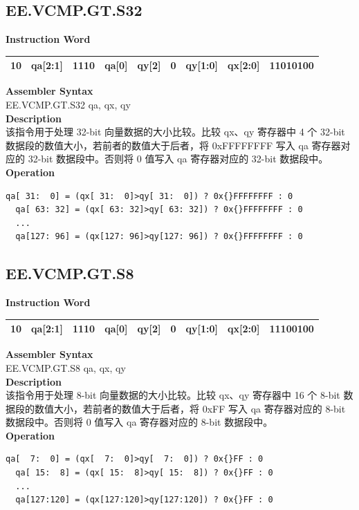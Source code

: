 \clearpage
\subsection{EE.VCMP.GT.S32}\label{instruction:EEVCMPGTS32}
\setlength\tabcolsep{6pt}
\textbf{Instruction Word} \\
\begin{tabular}{|c|c|c|c|c|c|c|c|c|}
	\hline
	10 & qa[2:1] & 1110 & qa[0] & qy[2] & 0 & qy[1:0] & qx[2:0] & 11010100 \\
	\hline
\end{tabular}

\textbf{Assembler Syntax} \\
EE.VCMP.GT.S32 qa, qx, qy \\
\textbf{Description} \\
该指令用于处理 32-bit 向量数据的大小比较。比较 qx、qy 寄存器中 4 个 32-bit 数据段的数值大小，若前者的数值大于后者，将 0x{}FFFFFFFF 写入 qa 寄存器对应的 32-bit 数据段中。否则将 0 值写入 qa 寄存器对应的 32-bit 数据段中。\\
\textbf{Operation}
\begin{lstlisting}[escapeinside=`?]
  qa[ 31:  0] = (qx[ 31:  0]>qy[ 31:  0]) ? 0x{}FFFFFFFF : 0
  qa[ 63: 32] = (qx[ 63: 32]>qy[ 63: 32]) ? 0x{}FFFFFFFF : 0
  ...
  qa[127: 96] = (qx[127: 96]>qy[127: 96]) ? 0x{}FFFFFFFF : 0
\end{lstlisting}

\clearpage
\subsection{EE.VCMP.GT.S8}\label{instruction:EEVCMPGTS8}
\setlength\tabcolsep{6pt}
\textbf{Instruction Word} \\
\begin{tabular}{|c|c|c|c|c|c|c|c|c|}
	\hline
	10 & qa[2:1] & 1110 & qa[0] & qy[2] & 0 & qy[1:0] & qx[2:0] & 11100100 \\
	\hline
\end{tabular}

\textbf{Assembler Syntax} \\
EE.VCMP.GT.S8 qa, qx, qy \\
\textbf{Description} \\
该指令用于处理 8-bit 向量数据的大小比较。比较 qx、qy 寄存器中 16 个 8-bit 数据段的数值大小，若前者的数值大于后者，将 0x{}FF 写入 qa 寄存器对应的 8-bit 数据段中。否则将 0 值写入 qa 寄存器对应的 8-bit 数据段中。\\
\textbf{Operation}
\begin{lstlisting}[escapeinside=`?]
  qa[  7:  0] = (qx[  7:  0]>qy[  7:  0]) ? 0x{}FF : 0
  qa[ 15:  8] = (qx[ 15:  8]>qy[ 15:  8]) ? 0x{}FF : 0
  ...
  qa[127:120] = (qx[127:120]>qy[127:120]) ? 0x{}FF : 0
\end{lstlisting}

